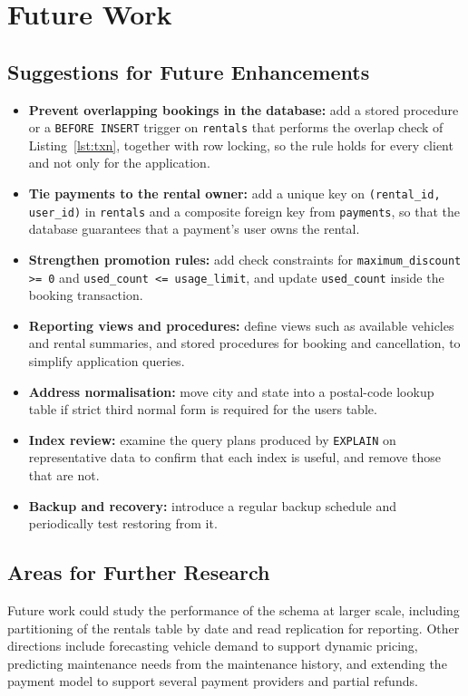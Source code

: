 \documentclass[10pt,a4paper]{report}
\newcommand{\col}[1]{\texttt{#1}}
\begin{document}
\section{Future Work}\label{chap:future}

\subsection{Suggestions for Future Enhancements}
\begin{itemize}
  \item \textbf{Prevent overlapping bookings in the database:} add a stored procedure or a \col{BEFORE INSERT} trigger on \col{rentals} that performs the overlap check of Listing~\ref{lst:txn}, together with row locking, so the rule holds for every client and not only for the application.
  \item \textbf{Tie payments to the rental owner:} add a unique key on \col{(rental_id, user_id)} in \col{rentals} and a composite foreign key from \col{payments}, so that the database guarantees that a payment's user owns the rental.
  \item \textbf{Strengthen promotion rules:} add check constraints for \col{maximum_discount >= 0} and \col{used_count <= usage_limit}, and update \col{used_count} inside the booking transaction.
  \item \textbf{Reporting views and procedures:} define views such as available vehicles and rental summaries, and stored procedures for booking and cancellation, to simplify application queries.
  \item \textbf{Address normalisation:} move city and state into a postal-code lookup table if strict third normal form is required for the users table.
  \item \textbf{Index review:} examine the query plans produced by \col{EXPLAIN} on representative data to confirm that each index is useful, and remove those that are not.
  \item \textbf{Backup and recovery:} introduce a regular backup schedule and periodically test restoring from it.
\end{itemize}

\subsection{Areas for Further Research}
Future work could study the performance of the schema at larger scale, including partitioning of the rentals table by date and read replication for reporting. Other directions include forecasting vehicle demand to support dynamic pricing, predicting maintenance needs from the maintenance history, and extending the payment model to support several payment providers and partial refunds.
\end{document}
